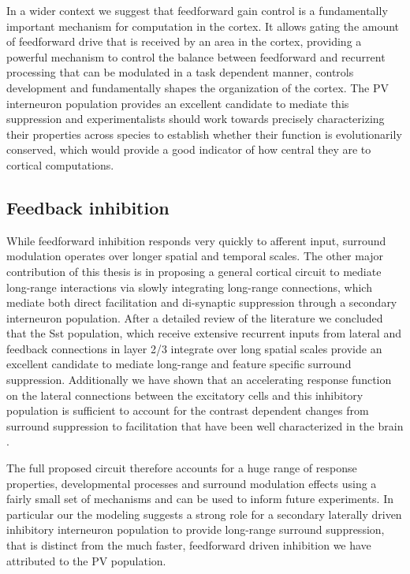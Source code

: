 In a wider context we suggest that feedforward gain control is a
fundamentally important mechanism for computation in the cortex. It
allows gating the amount of feedforward drive that is received by an
area in the cortex, providing a powerful mechanism to control the
balance between feedforward and recurrent processing that can be
modulated in a task dependent manner, controls development and
fundamentally shapes the organization of the cortex. The PV
interneuron population provides an excellent candidate to mediate this
suppression and experimentalists should work towards precisely
characterizing their properties across species to establish whether
their function is evolutionarily conserved, which would provide a good
indicator of how central they are to cortical computations.

\subsection{Feedback inhibition}

While feedforward inhibition responds very quickly to afferent input,
surround modulation operates over longer spatial and temporal
scales. The other major contribution of this thesis is in proposing a
general cortical circuit to mediate long-range interactions via slowly
integrating long-range connections, which mediate both direct
facilitation and di-synaptic suppression through a secondary
interneuron population. After a detailed review of the literature we
concluded that the Sst population, which receive extensive recurrent
inputs from lateral and feedback connections in layer 2/3 integrate
over long spatial scales \citep{Xu2009, Adesnik2012, Nienborg2013}
provide an excellent candidate to mediate long-range and feature
specific surround suppression. Additionally we have shown that an
accelerating response function on the lateral connections between the
excitatory cells and this inhibitory population is sufficient to
account for the contrast dependent changes from surround suppression
to facilitation that have been well characterized in the brain
\citep{Levitt1997, Polat1998, Dragoi2000, Wang2009}.

The full proposed circuit therefore accounts for a huge range of
response properties, developmental processes and surround modulation
effects using a fairly small set of mechanisms and can be used to
inform future experiments. In particular our the modeling suggests a
strong role for a secondary laterally driven inhibitory interneuron
population to provide long-range surround suppression, that is
distinct from the much faster, feedforward driven inhibition we have
attributed to the PV population.

